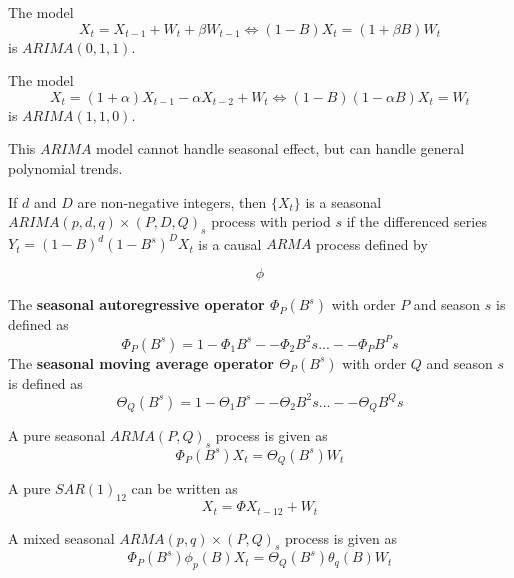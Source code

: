\begin{example}\cite[140]{cowpertwait2009introductory} The model $$X_t = X_{t-1}+W_t + \beta W_{t-1} \Leftrightarrow (1-B)X_t = (1+\beta B)W_t$$
is $ARIMA(0,1,1)$.
\end{example}

\begin{example}\cite[140]{cowpertwait2009introductory} The model $$X_t = (1+\alpha)X_{t-1}-\alpha X_{t-2}+W_t \Leftrightarrow (1-B)(1-\alpha B)X_t = W_t$$
is $ARIMA(1,1,0)$.
\end{example}


\begin{remark}
This $ARIMA$ model cannot handle seasonal effect, but can handle general polynomial trends. 
\end{remark}

\begin{definition}
If $d$ and $D$ are non-negative integers, then $\{X_t\}$ is a seasonal $ARIMA(p,d,q)\times (P,D,Q)_s$ process with period $s$ if the differenced series $Y_t = (1-B)^d(1-B^s)^DX_t$ is a causal $ARMA$ process defined by 

$$\phi$$
\end{definition}


\begin{definition}
The \textbf{seasonal autoregressive  operator $\Phi_P(B^s)$} with order $P$ and season $s$ is defined as
$$\Phi_P(B^s) = 1- \Phi_1 B^s -- \Phi_2 B^2s ... - - \Phi_P B^Ps$$
The \textbf{seasonal moving average  operator $\Theta_P(B^s)$} with order $Q$ and season $s$ is defined as
$$\Theta_Q(B^s) = 1- \Theta_1 B^s -- \Theta_2 B^2s ... - - \Theta_Q B^Qs$$

\end{definition}

\begin{definition}
A pure seasonal $ARMA(P,Q)_s$ process is given as
$$\Phi_P(B^s)X_t = \Theta_Q(B^s)W_t$$
\end{definition}

\begin{example}[A seasonal AR(1)]
A pure $SAR(1)_{12}$ can be written as
$$X_t = \Phi X_{t-12} + W_t$$
\end{example}

\begin{definition}
A mixed seasonal $ARMA(p,q)\times(P,Q)_s$ process is given as
$$\Phi_P(B^s)\phi_p(B)X_t = \Theta_Q(B^s)\theta_q(B)W_t$$
\end{definition}

